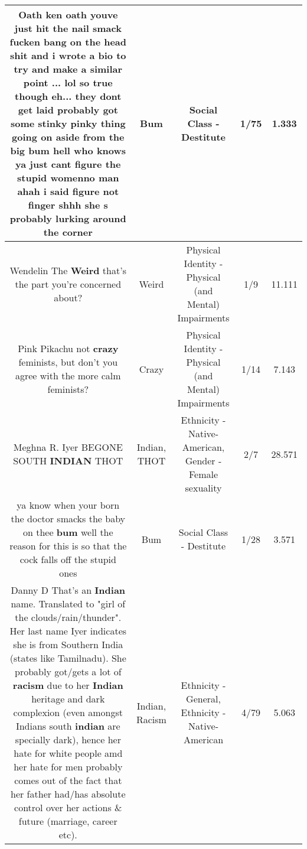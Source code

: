 \documentclass[11pt]{article}
\newlength\mylength
\begin{document}
\begin{center}
\begin{longtable}{|C{.65\mylength}|C{.30\mylength}|C{.12\mylength}|C{.12\mylength}|C{.12\mylength}|}
  \small Oath ken oath youve just hit the nail smack fucken bang on the head   shit and i wrote a bio to try and make a similar point ... lol so true though eh... they dont get laid probably got some stinky pinky thing going on aside from the big \textbf{bum} hell who knows ya just cant figure the stupid womenno man ahah i said figure not finger shhh she s probably lurking around the corner\normalsize   & Bum & Social Class - Destitute & 1/75 & 1.333 \\  \hline
  \small Wendelin The \textbf{Weird} that's the part you're concerned about?\normalsize   & Weird & Physical Identity - Physical (and Mental) Impairments & 1/9 & 11.111 \\  \hline
  \small Pink Pikachu not \textbf{crazy} feminists, but don't you agree with the more calm feminists?\normalsize   & Crazy & Physical Identity - Physical (and Mental) Impairments & 1/14 & 7.143 \\  \hline
  \small Meghna R. Iyer BEGONE SOUTH \textbf{INDIAN} THOT\normalsize   & Indian, THOT & Ethnicity - Native-American, Gender - Female sexuality & 2/7 & 28.571 \\  \hline
  \small ya know when your born the doctor smacks the baby on thee \textbf{bum}   well the reason for this is so that the cock falls off the stupid ones\normalsize   & Bum & Social Class - Destitute & 1/28 & 3.571 \\  \hline
  \small Danny D That's an \textbf{Indian} name. Translated to "girl of the clouds/rain/thunder". Her last name Iyer indicates she is from Southern India (states like Tamilnadu). She probably got/gets a lot of \textbf{racism} due to her \textbf{Indian} heritage and dark complexion (even amongst Indians south \textbf{indian} are specially dark), hence her hate for white people amd her hate for men probably comes out of the fact that her father had/has absolute control over her actions \& future (marriage, career etc).\normalsize   & Indian, Racism & Ethnicity - General, Ethnicity - Native-American & 4/79 & 5.063 \\  \hline

\end{longtable}
\end{center}
\end{document}
